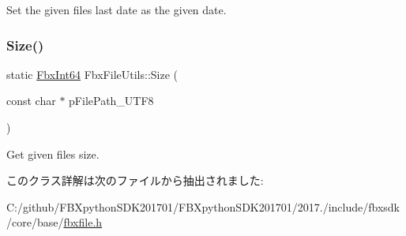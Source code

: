 Set the given file\textquotesingle{}s last date as the given date. 

\mbox{\label{class_fbx_file_utils_af146d0591ec4ec528b489b8b4cf60db2}} 
\subsubsection{\texorpdfstring{Size()}{Size()}}
{\footnotesize\ttfamily static \hyperlink{fbxtypes_8h_ac7e1334c7c6aacc9c8a9dccddebb4368}{Fbx\+Int64} Fbx\+File\+Utils\+::\+Size (\begin{DoxyParamCaption}\item[{const char $\ast$}]{p\+File\+Path\+\_\+\+U\+T\+F8 }\end{DoxyParamCaption})\hspace{0.3cm}{\ttfamily [static]}}



Get given file\textquotesingle{}s size. 



このクラス詳解は次のファイルから抽出されました\+:\begin{DoxyCompactItemize}
\item 
C\+:/github/\+F\+B\+Xpython\+S\+D\+K201701/\+F\+B\+Xpython\+S\+D\+K201701/2017./include/fbxsdk/core/base/\hyperlink{fbxfile_8h}{fbxfile.\+h}\end{DoxyCompactItemize}
